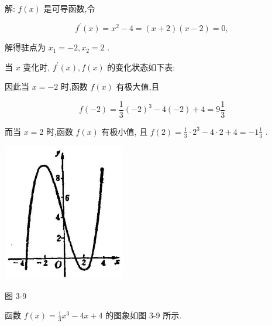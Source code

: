 \documentclass[10pt]{article}
\begin{document}
解: \(f\left( x\right)\) 是可导函数,令

\[
{f}^{\prime }\left( x\right) = {x}^{2} - 4 = \left( {x + 2}\right) \left( {x - 2}\right) = 0,
\]

解得驻点为 \({x}_{1} = - 2,{x}_{2} = 2\) .

当 \(x\) 变化时, \({f}^{\prime }\left( x\right) ,f\left( x\right)\) 的变化状态如下表:

\begin{center}
\end{center}

因此当 \(x = - 2\) 时,函数 \(f\left( x\right)\) 有极大值,且

\[
f\left( {-2}\right) = \frac{1}{3}{\left( -2\right) }^{3} - 4\left( {-2}\right) + 4 = 9\frac{1}{3}
\]

而当 \(x = 2\) 时,函数 \(f\left( x\right)\) 有极小值, 且 \(f\left( 2\right) = \frac{1}{3} \cdot {2}^{3} - 4 \cdot 2 + 4 = - 1\frac{1}{3}\) .

\begin{center}
\includegraphics[max width=0.4\textwidth]{images/01912c18-5c3f-733d-b775-749ba9897a9d_143_629914.jpg}
\end{center}

图 3-9

函数 \(f\left( x\right) = \frac{1}{3}{x}^{3} - {4x} + 4\) 的图象如图 3-9 所示.
\end{document}
